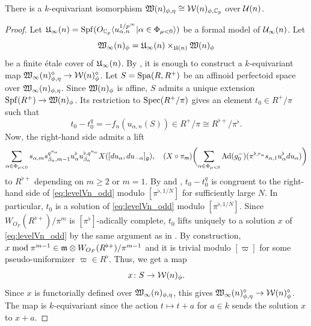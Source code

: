 \documentclass[12pt,reqno]{amsart}
\begin{document}
\begin{prop} \label{prop:good_reduction_odd}
    There is a $k$-equivariant isomorphism ${\mathfrak{W}}(n)_{\phi, \eta} \cong {\mathcal{W}}(n)_{\phi, \mathbb{C}_p}$ over ${\mathcal{U}}(n)$. 
\end{prop}
\begin{proof}
    Let ${\mathfrak{U}}_\infty(n) = {\operatorname{Spf}}(O_{\mathbb{C}_p}\langle u_{\alpha,n}^{1/p^\infty} \vert \alpha \in \Phi_{\mu < 0} \rangle )$ be a formal model of ${\mathcal{U}}_\infty(n)$. Let 
    \[
        {\mathfrak{W}}_\infty(n)_\phi = {\mathfrak{U}}_\infty(n)\times_{{\mathfrak{U}}(n)} {\mathfrak{W}}(n)_\phi
    \]
    be a finite \'{e}tale cover of ${\mathfrak{U}}_\infty(n)$. By , it is enough to construct a $k$-equivariant map ${\mathfrak{W}}_\infty(n)_{\phi, \eta}^\diamond \to {\mathcal{W}}(n)^\diamond_\phi$. Let $S = {\operatorname{Spa}}(R,R^+)$ be an affinoid perfectoid space over ${\mathfrak{W}}_\infty(n)_{\phi, \eta}$. Since ${\mathfrak{W}}(n)_\phi$ is affine, $S$ admits a unique extension ${\operatorname{Spf}}(R^+) \to {\mathfrak{W}}(n)_\phi$. Its restriction to ${\operatorname{Spec}}(R^+/\pi)$ gives an element $t_0 \in R^+/\pi$ such that
    \[
        t_0 - t_0^q = - f_n(u_{\alpha, n}(S)) \in R^+ / \pi \cong R^{\flat +} / \pi^\flat. 
    \]
    Now, the right-hand side admits a lift
    \[
        \sum_{\alpha \in \Phi_{\mu<0}} s_{\alpha,m}s_{\beta_\alpha,m-1}^{q^{n_\alpha}} u_\alpha^\flat u_{\beta_\alpha}^{\flat, q^{n_\alpha}}X([du_\alpha, du_{-\alpha}]_{{\mathfrak{g}}}) ,\quad (X \circ \pi_{{\mathsf{m}}})\biggl(\sum_{\alpha \in \Phi_{\mu < 0}} {\operatorname{Ad}}(g^-_0)(\pi^{\flat, r_\alpha} s_{\alpha, 1} u_\alpha^\flat du_\alpha)\biggr)
    \]
    to $R^{\flat +}$ depending on $m \geq 2$ or $m = 1$. By  and , $t_0 - t_0^q$ is congruent to the right-hand side of \eqref{eq:levelVn_odd} modulo $[\pi^{\flat, 1/N}]$ for sufficiently large $N$. In particular, $t_0$ is a solution of \eqref{eq:levelVn_odd} modulo $[\pi^{\flat, 1/N}]$. Since $W_{O_F}(R^{\flat +})/\pi^{m}$ is $[\pi^{\flat}]$-adically complete, $t_0$ lifts uniquely to a solution $x$ of \eqref{eq:levelVn_odd} by the same argument as in \cite[Lemma 3.5]{Tak25z}. By construction, $x \bmod \pi^{m - 1} \in {\mathfrak{m}} \otimes W_{O_F}(R^{\flat+}) / \pi^{m - 1}$ and it is trivial modulo $[\varpi]$ for some pseudo-uniformizer $\varpi \in R^\flat$. Thus, we get a map
    \[
        x \colon S \to {\mathcal{W}}(n)_\phi. 
    \]
    Since $x$ is functorially defined over ${\mathfrak{W}}_\infty(n)_{\phi, \eta}$, this gives ${\mathfrak{W}}_\infty(n)_{\phi, \eta}^\diamond \to {\mathcal{W}}(n)^\diamond_\phi$. The map is $k$-equivariant since the action $t \mapsto t + a$ for $a \in k$ sends the solution $x$ to $x + a$.  
\end{proof}
\end{document}
